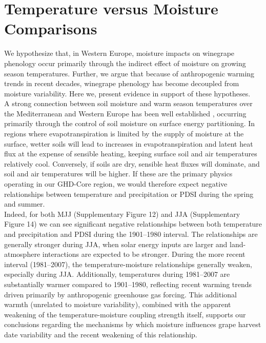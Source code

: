 \documentclass[12pt]{article}
\begin{document}
\section*{Temperature versus Moisture Comparisons}
\noindent We hypothesize that, in Western Europe, moisture impacts on winegrape phenology occur primarily through the indirect effect of moisture on growing season temperatures. Further, we argue that because of anthropogenic warming trends in recent decades, winegrape phenology has become decoupled from moisture variability. Here we, present evidence in support of these hypotheses.\\
\indent A strong connection between soil moisture and warm season temperatures over the Mediterranean and Western Europe has been well established \cite{Fischer2007,Miralles2014}, occurring primarily through the control of soil moisture on surface energy partitioning. In regions where evapotranspiration is limited by the supply of moisture at the surface, wetter soils will lead to increases in evapotranspiration and latent heat flux at the expense of sensible heating, keeping surface soil and air temperatures relatively cool. Conversely, if soils are dry, sensible heat fluxes will dominate, and soil and air temperatures will be higher. If these are the primary physics operating in our GHD-Core region, we would therefore expect negative relationships between temperature and precipitation or PDSI during the spring and summer.\\
\indent Indeed, for both MJJ (Supplementary Figure 12) and JJA (Supplementary Figure 14) we can see significant negative relationships between both temperature and precipitation and PDSI during the 1901--1980 interval. The relationships are generally stronger during JJA, when solar energy inputs are larger and land-atmosphere interactions are expected to be stronger. During the more recent interval (1981--2007), the temperature-moisture relationships generally weaken, especially during JJA. Additionally, temperatures during 1981--2007 are substantially warmer compared to 1901--1980, reflecting recent warming trends driven primarily by anthropogenic greenhouse gas forcing. This additional warmth (unrelated to moisture variability), combined with the apparent weakening of the temperature-moisture coupling strength itself, supports our conclusions regarding the mechanisms by which moisture influences grape harvest date variability and the recent weakening of this relationship.
\end{document}
